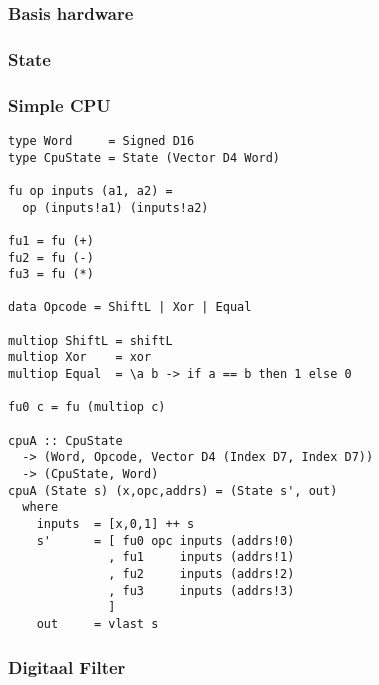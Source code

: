 \documentclass{paper}
\begin{document}
\subsubsection*{Basis hardware} %
\label{ssub:basis_hardware}


\subsubsection*{State} %
\label{ssub:state}


\subsubsection*{Simple CPU} %
\label{ssub:simple_cpu}
\begin{lstlisting}[label=Simple_CPU,caption=Simple CPU,float=t]
type Word     = Signed D16
type CpuState = State (Vector D4 Word)

fu op inputs (a1, a2) =
  op (inputs!a1) (inputs!a2)

fu1 = fu (+)
fu2 = fu (-)
fu3 = fu (*)

data Opcode = ShiftL | Xor | Equal

multiop ShiftL = shiftL
multiop Xor    = xor
multiop Equal  = \a b -> if a == b then 1 else 0

fu0 c = fu (multiop c)

cpuA :: CpuState
  -> (Word, Opcode, Vector D4 (Index D7, Index D7))
  -> (CpuState, Word)
cpuA (State s) (x,opc,addrs) = (State s', out)
  where
    inputs  = [x,0,1] ++ s
    s'      = [ fu0 opc inputs (addrs!0)
              , fu1     inputs (addrs!1)
              , fu2     inputs (addrs!2)
              , fu3     inputs (addrs!3)
              ]
    out     = vlast s
\end{lstlisting}

\subsubsection*{Digitaal Filter} %
\label{ssub:digitaal_filter}

\end{document}

